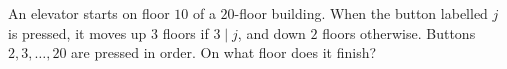 An elevator starts on floor $10$ of a $20$-floor building. When the button labelled $j$ is pressed, it moves up $3$ floors if $3\mid j$, and down $2$ floors otherwise. Buttons $2,3,\ldots,20$ are pressed in order. On what floor does it finish?
